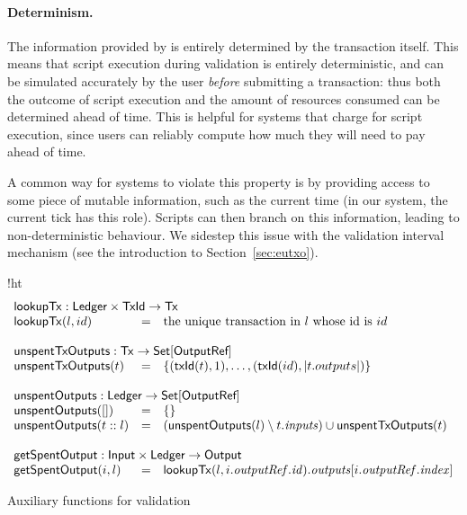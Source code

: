 \paragraph{Determinism.}
The information provided by \ctx{} is entirely determined by the
transaction itself. This means that script execution during validation
is entirely deterministic, and can be simulated accurately by the user
\emph{before} submitting a transaction: thus both the outcome of
script execution and the amount of resources consumed can be
determined ahead of time. This is helpful for systems that charge for
script execution, since users can reliably compute how much they will
need to pay ahead of time.

A common way for systems to violate this property is by providing
access to some piece of mutable information, such as the current time
(in our system, the current tick has this role). Scripts can then
branch on this information, leading to non-deterministic behaviour. We
sidestep this issue with the validation interval mechanism (see the
introduction to Section~\ref{sec:eutxo}).

\begin{ruledfigure}{!ht}
  \begin{displaymath}
  \begin{array}{lll}
  \multicolumn{3}{l}{\lookupTx : \s{Ledger} \times \TxId \rightarrow \eutxotx{}}\\
  \lookupTx(l,id) &=& \textrm{the unique transaction in $l$ whose id is $id$}\\
  \\
  \multicolumn{3}{l}{\txunspent : \eutxotx \rightarrow \Set{\s{OutputRef}}}\\
  \txunspent(t) &=& \{(\txId(t),1), \ldots, (\txId(id),\left|t.outputs\right|)\}\\
  \\
  \multicolumn{3}{l}{\unspent : \s{Ledger} \rightarrow \Set{\s{OutputRef}}}\\
  \unspent([]) &=& \emptymap \\
  \unspent(t::l) &=& (\unspent(l) \setminus t.\inputs) \cup \txunspent(t)\\
  \\
  \multicolumn{3}{l}{\getSpent : \s{Input} \times \s{Ledger} \rightarrow \s{Output}}\\
  \getSpent(i,l) &=& \lookupTx(l, i.\outputref.\id).\outputs[i.\outputref.\idx]
  \end{array}
  \end{displaymath}
  \caption{Auxiliary functions for \EUTXO{} validation}
  \label{fig:validation-functions-1}
\end{ruledfigure}


